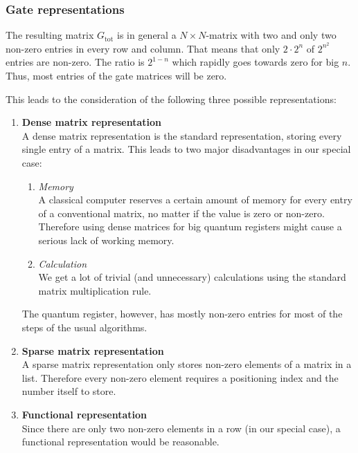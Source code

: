 \documentclass[bibliography=totocnumbered]{article}
\theoremstyle{NoticeStyle}
\begin{document}
\subsubsection{Gate representations}
The resulting matrix $G_\text{tot}$ is in general a $N \times N$-matrix with two and only two non-zero entries in every row and column. That means that only $2\cdot 2^n$ of $2^{n^2}$ entries are non-zero. The ratio is $2^{1-n}$ which rapidly goes towards zero for big $n$. Thus, most entries of the gate matrices will be zero.

This leads to the consideration of the following three possible representations:
\begin{enumerate}
	\item \textbf{Dense matrix representation}\\
		A dense matrix representation is the standard representation, storing every single entry of a matrix. This leads to two major disadvantages in our special case:		
		\begin{enumerate}
			\item \textit{Memory}\\
			A classical computer reserves a certain amount of memory for every entry of a conventional matrix, no matter if the value is zero or non-zero. Therefore using dense matrices for big quantum registers might cause a serious lack of working memory.
			\item \textit{Calculation}\\
			We get a lot of trivial (and unnecessary) calculations using the standard matrix multiplication rule.
		\end{enumerate}
		The quantum register, however, has mostly non-zero entries for most of the steps of the usual algorithms.
	\item \textbf{Sparse matrix representation}\\
		A sparse matrix representation only stores non-zero elements of a matrix in a list. Therefore every non-zero element requires a positioning index and the number itself to store. 
	\item \textbf{Functional representation}\\
		Since there are only two non-zero elements in a row (in our special case), a functional representation would be reasonable.
\end{enumerate}



\end{document}
